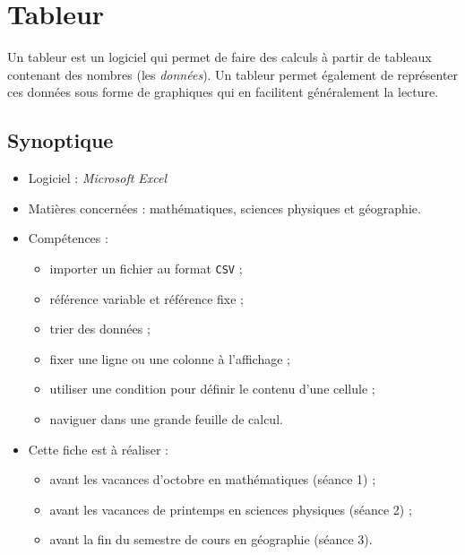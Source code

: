 \chapter{Tableur}  

Un tableur est un logiciel qui permet de faire des calculs à partir de tableaux contenant des nombres (les \emph{données}). Un tableur permet également de représenter ces données sous forme de graphiques qui en facilitent généralement la lecture.




{\footnotesize
\section*{Synoptique}

\begin{itemize}
\item Logiciel : \emph{Microsoft Excel}
\item Matières concernées : mathématiques, sciences physiques et géographie.
\item Compétences : 
        \begin{itemize}
        \item importer un fichier au format \texttt{CSV} ;
        \item référence variable et référence fixe ;
        \item trier des données ;
	\item fixer une ligne ou une colonne à l'affichage ;
	\item utiliser une condition pour définir le contenu d'une cellule ;
	\item naviguer dans une grande feuille de calcul.
        \end{itemize}
\item Cette fiche est à réaliser :
        \begin{itemize}
        \item avant les vacances d'octobre en mathématiques (séance 1) ;
        \item avant les vacances de printemps en sciences physiques (séance 2) ;
        \item avant la fin du semestre de cours en géographie (séance 3). 
        \end{itemize}
\end{itemize}
}




